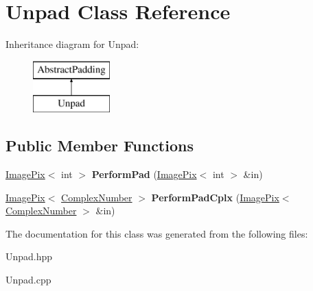 \hypertarget{class_unpad}{}\section{Unpad Class Reference}
\label{class_unpad}
Inheritance diagram for Unpad\+:\begin{figure}[H]
\begin{center}
\leavevmode
\includegraphics[height=2.000000cm]{class_unpad}
\end{center}
\end{figure}
\subsection*{Public Member Functions}
\begin{DoxyCompactItemize}
\item 
\mbox{\label{class_unpad_aa32b832e71f6b6e69a9ba8e7965573da}} 
\hyperlink{class_image_pix}{Image\+Pix}$<$ int $>$ {\bfseries Perform\+Pad} (\hyperlink{class_image_pix}{Image\+Pix}$<$ int $>$ \&in)
\item 
\mbox{\label{class_unpad_ab38bc3289f7cedeccf4c56d918c48261}} 
\hyperlink{class_image_pix}{Image\+Pix}$<$ \hyperlink{class_complex_number}{Complex\+Number} $>$ {\bfseries Perform\+Pad\+Cplx} (\hyperlink{class_image_pix}{Image\+Pix}$<$ \hyperlink{class_complex_number}{Complex\+Number} $>$ \&in)
\end{DoxyCompactItemize}


The documentation for this class was generated from the following files\+:\begin{DoxyCompactItemize}
\item 
Unpad.\+hpp\item 
Unpad.\+cpp\end{DoxyCompactItemize}
